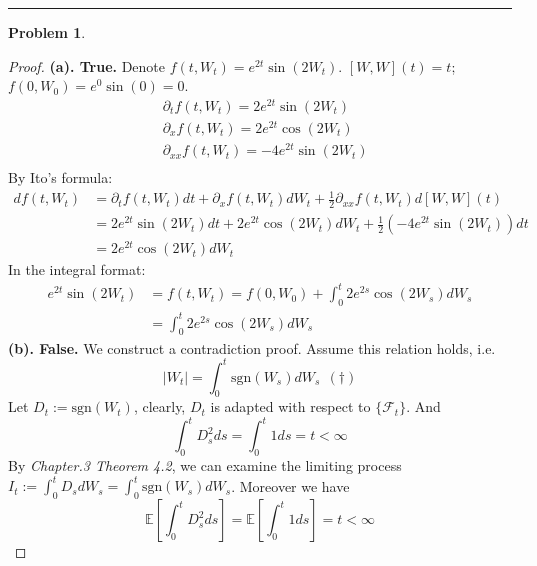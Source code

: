 \documentclass[a4paper, 10pt]{article}
\theoremstyle{definition}
\newtheorem{problem}{Problem}
\theoremstyle{hSol}
\begin{document}
\noindent\rule{16cm}{0.4pt}
\begin{problem}
\end{problem}
\begin{proof} \textbf{(a). True.} Denote $f(t, W_t) = e^{2t} \sin(2W_t)$. $[W,W](t) = t$;  $f(0,W_0) = e^0 \sin(0)=0$.
\begin{equation}
	\begin{split}
		&\partial_t f(t,W_t) = 2e^{2t} \sin(2W_t)\\ 
		&\partial_x f(t,W_t) = 2e^{2t} \cos(2W_t)\\ 
		&\partial_{xx} f(t,W_t) = -4e^{2t} \sin(2W_t)\\ 
	\end{split}
\end{equation}
By Ito's formula:
\begin{equation}
	\begin{split}
		df(t,W_t) &= \partial_t f(t,W_t) dt +  \partial_x f(t,W_t) dW_t + \frac{1}{2} \partial_{xx} f(t,W_t) d[W, W](t)  \\
		&= 2e^{2t} \sin(2W_t) dt + 2e^{2t} \cos(2W_t) dW_t + \frac{1}{2} (-4e^{2t} \sin(2W_t))dt \\
		&= 2e^{2t} \cos(2W_t) dW_t
	\end{split}
\end{equation}
In the integral format:
\begin{equation}
	\begin{split}
		e^{2t} \sin(2W_t)  &= f(t,W_t) = f(0,W_0) + \int_0^t 2e^{2s} \cos(2W_s) dW_s \\
		&=\int_0^t 2e^{2s} \cos(2W_s) dW_s
	\end{split}
\end{equation}
\textbf{(b). False.} We construct a contradiction proof. Assume this relation holds, i.e.\\
$$
|W_t| = \int_0^t \text{sgn}(W_s)dW_s~~(\dag)
$$
Let $D_t := \text{sgn}(W_t)$, clearly, $D_t$ is adapted with respect to $\{\mathcal{F}_t\}$. And
\begin{equation}
	\int_0^t D_s^2 ds = \int_0^t 1 ds = t < \infty
\end{equation}
By \textit{Chapter.3 Theorem 4.2}, we can examine the limiting process $I_t:=\int_0^t D_s dW_s = \int_0^t \text{sgn}(W_s)dW_s$. Moreover we have
\begin{equation}
	\mathbb{E}\left[\int_0^t D_s^2 ds\right] = \mathbb{E}\left[\int_0^t 1 ds\right] = t < \infty
\end{equation}

\end{proof}
\end{document}
